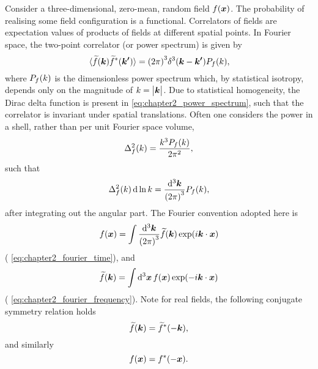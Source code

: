 Consider a three-dimensional, zero-mean, random field \(f(\vb*{x})\).
The probability of realising some field configuration is a functional.
Correlators of fields are expectation values of products of fields at different spatial points.
In Fourier space, the two-point correlator (or power spectrum) is given by
%
\begin{equation}\label{eq:chapter2_power_spectrum}
	\expval*{\widetilde{f}(\vb*{k}) \widetilde{f}^{\ast}(\vb*{k'})}
	= {(2\pi)}^{3} \delta^{3}(\vb*{k} - \vb*{k'}) P_{f}(k),
\end{equation}
%
where \(P_{f}(k)\) is the dimensionless power spectrum which, by statistical isotropy, depends only on the magnitude of \(k=\big\lvert\vb*{k}\big\rvert\).
Due to statistical homogeneity, the Dirac delta function is present in \cref{eq:chapter2_power_spectrum}, such that the correlator is invariant under spatial translations.
Often one considers the power in a shell, rather than per unit Fourier space volume, \ie{}
%
\begin{equation}\label{eq:chapter2_power_shell}
	\Delta_{f}^{2}(k)
	= \frac{k^{3}P_{f}(k)}{2\pi^{2}},
\end{equation}
%
such that
%
\begin{equation}
	\Delta_{f}^{2}(k) \dd{\ln{k}}
	= \frac{\dd[3]{\vb*{k}}}{{(2\pi)}^{3}} P_{f}(k),
\end{equation}
%
after integrating out the angular part.
The Fourier convention adopted here is
%
\begin{equation}
	f(\vb*{x})
	= \int\frac{\dd[3]{\vb*{k}}}{{(2\pi)}^{3}} \widetilde{f}(\vb*{k}) \exp(i\vb*{k}\cdot\vb*{x})
\end{equation}
%
(\cf{} \cref{eq:chapter2_fourier_time}), and
%
\begin{equation}
	\widetilde{f}(\vb*{k})
	= \int\dd[3]{\vb*{x}} f(\vb*{x}) \exp(-i\vb*{k}\cdot\vb*{x})
\end{equation}
%
(\cf{} \cref{eq:chapter2_fourier_frequency}).
Note for real fields, the following conjugate symmetry relation holds
%
\begin{equation}
	\widetilde{f}(\vb*{k})
	= \widetilde{f}^{\ast}(-\vb*{k}),
\end{equation}
%
and similarly
%
\begin{equation}
	f(\vb*{x})
	= f^{\ast}(-\vb*{x}).
\end{equation}

